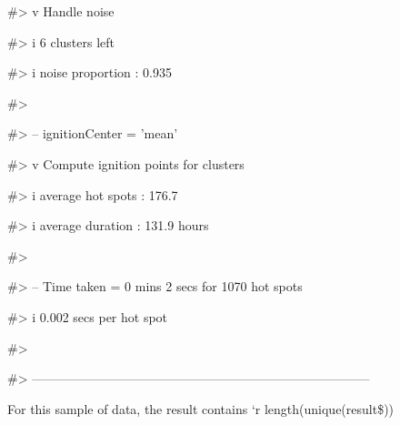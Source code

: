 \begin{Schunk}
\begin{Soutput}
#> v Handle noise
\end{Soutput}
\begin{Soutput}
#> i 6 clusters left
\end{Soutput}
\begin{Soutput}
#> i noise proportion : 0.935 %
\end{Soutput}
\begin{Soutput}
#> 
\end{Soutput}
\begin{Soutput}
#> -- ignitionCenter = 'mean'
\end{Soutput}
\begin{Soutput}
#> v Compute ignition points for clusters
\end{Soutput}
\begin{Soutput}
#> i average hot spots : 176.7
\end{Soutput}
\begin{Soutput}
#> i average duration : 131.9 hours
\end{Soutput}
\begin{Soutput}
#> 
\end{Soutput}
\begin{Soutput}
#> -- Time taken = 0 mins 2 secs for 1070 hot spots
\end{Soutput}
\begin{Soutput}
#> i 0.002 secs per hot spot
\end{Soutput}
\begin{Soutput}
#> 
\end{Soutput}
\begin{Soutput}
#> --------------------------------------------------------------------------------
\end{Soutput}
\end{Schunk}

For this sample of data, the result contains `r length(unique(result\$))

